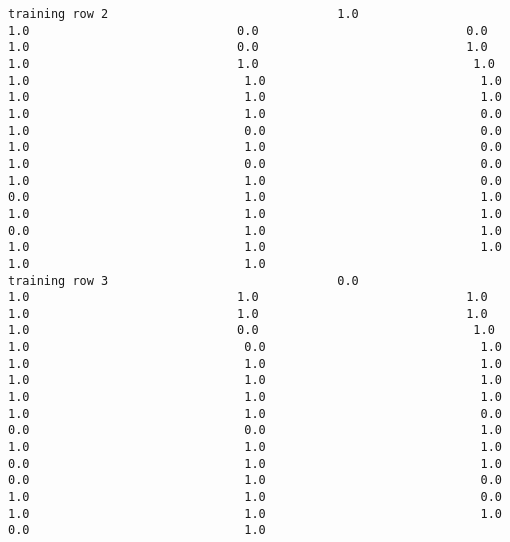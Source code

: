 \documentclass[11pt]{article}
\begin{document}
\begin{verbatim}
training row 2                                1.0                             1.0                             0.0                             0.0                             1.0                             0.0                             1.0                             1.0                             1.0                              1.0                              1.0                              1.0                              1.0                              1.0                              1.0                              1.0                              1.0                              1.0                              0.0                              1.0                              0.0                              0.0                              1.0                              1.0                              0.0                              1.0                              0.0                              0.0                              1.0                              1.0                              0.0                              0.0                              1.0                              1.0                              1.0                              1.0                              1.0                              0.0                              1.0                              1.0                              1.0                              1.0                              1.0                              1.0                              1.0
training row 3                                0.0                             1.0                             1.0                             1.0                             1.0                             1.0                             1.0                             1.0                             0.0                              1.0                              1.0                              0.0                              1.0                              1.0                              1.0                              1.0                              1.0                              1.0                              1.0                              1.0                              1.0                              1.0                              1.0                              1.0                              0.0                              0.0                              0.0                              1.0                              1.0                              1.0                              1.0                              0.0                              1.0                              1.0                              0.0                              1.0                              0.0                              1.0                              1.0                              0.0                              1.0                              1.0                              1.0                              0.0                              1.0

\end{verbatim}
\end{document}
